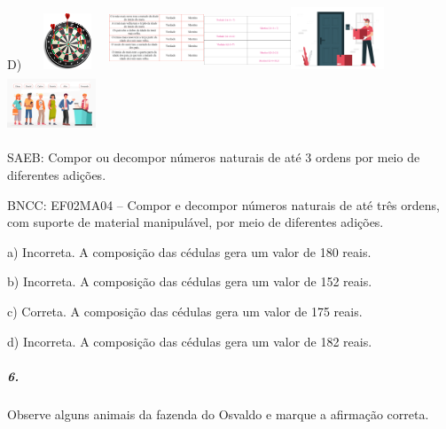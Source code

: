 D)
\includegraphics[width=0.98131in,height=0.65625in]{media/image108.png}\includegraphics[width=1.10972in,height=0.74212in]{media/image109.png}\includegraphics[width=1.02736in,height=0.68704in]{media/image110.png}\includegraphics[width=1.09268in,height=0.73073in]{media/image112.png}\includegraphics[width=1.04264in,height=0.69727in]{media/image113.png}

SAEB: Compor ou decompor números naturais de até 3 ordens por
meio de diferentes adições.

BNCC: EF02MA04 -- Compor e decompor números naturais de até três ordens,
com suporte de material manipulável, por meio de diferentes adições.

a) Incorreta. A composição das cédulas gera um valor de 180 reais.

b) Incorreta. A composição das cédulas gera um valor de 152 reais.

c) Correta. A composição das cédulas gera um valor de 175 reais.

d) Incorreta. A composição das cédulas gera um valor de 182 reais.

\subparagraph{6. }\label{section-105}

Observe alguns animais da fazenda do Osvaldo e marque a afirmação
correta.

